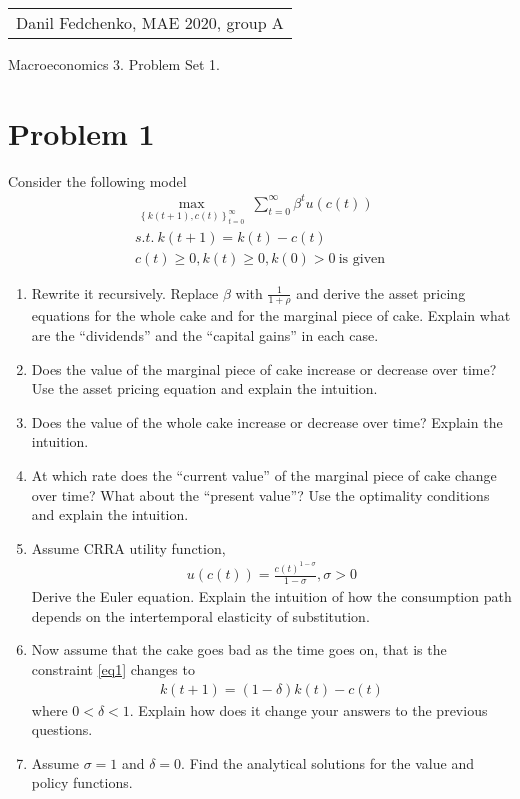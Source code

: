 \documentclass[a4paper]{article}
\begin{document}
	\begin{flushright}
	\begin{tabular}{r}
		Danil Fedchenko, MAE 2020, group A \\
	\end{tabular}
\end{flushright}


\begin{center}
	Macroeconomics 3. Problem Set 1.
\end{center}
\section*{Problem 1}
Consider the following model
\begin{align}\label{eq1}
\underset{\left\{k(t+1), c(t)\right\}_{t=0}^{\infty}}{\max}\ \sum_{t=0}^{\infty} \beta^t u(c(t))\nonumber\\
s.t.\ k(t+1) = k(t) - c(t) \\
c(t) \ge 0, k(t) \ge 0, k(0) > 0\ \text{is given}\nonumber
\end{align}
\begin{enumerate}
	\item Rewrite it recursively. Replace $\beta$ with $\frac{1}{1+\rho}$
	and derive the asset pricing equations for the whole
	cake and for the marginal piece of cake. Explain what are the “dividends” and the “capital gains”
	in each case.
	\item Does the value of the marginal piece of cake increase or decrease over time? Use the asset pricing
	equation and explain the intuition.
	\item Does the value of the whole cake increase or decrease over time? Explain the intuition.
	\item At which rate does the “current value” of the marginal piece of cake change over time? What
	about the “present value”? Use the optimality conditions and explain the intuition.
	\item Assume CRRA utility function,
	\begin{align*}
	u(c(t)) = \frac{c(t)^{1 - \sigma}}{1 - \sigma}, \sigma > 0
	\end{align*}
	Derive the Euler equation. Explain the intuition of how the consumption path depends on the
	intertemporal elasticity of substitution.

	\item Now assume that the cake goes bad as the time goes on, that is the constraint \eqref{eq1} changes to
	\begin{align*}
	k (t + 1) = (1 - \delta) k (t) - c (t)
	\end{align*}
	where $0 < \delta < 1$. Explain how does it change your answers to the previous questions.
	\item Assume $\sigma = 1$ and $\delta = 0$. Find the analytical solutions for the value and policy functions.
\end{enumerate}
\end{document}
